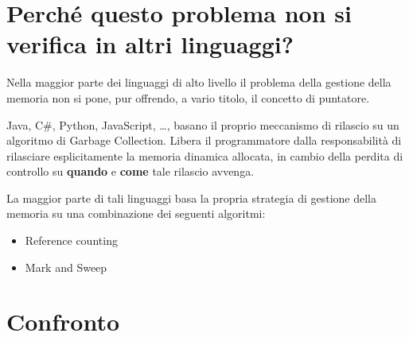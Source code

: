 \section{Perché questo problema non si verifica in altri linguaggi?  }

Nella maggior parte dei linguaggi di alto livello il problema della gestione della
memoria non si pone, pur offrendo, a vario titolo, il concetto di puntatore.


Java, C\#, Python, JavaScript, …, basano il proprio meccanismo di rilascio su un
algoritmo di Garbage Collection. Libera il programmatore dalla responsabilità di rilasciare esplicitamente la memoria dinamica allocata, in cambio della perdita di controllo su \textbf{quando} e \textbf{come} tale rilascio avvenga.


La maggior parte di tali linguaggi basa la propria strategia di gestione della memoria
su una combinazione dei seguenti algoritmi:

\begin{itemize}
  \item Reference counting
  \item Mark and Sweep
\end{itemize}


\section{Confronto}

